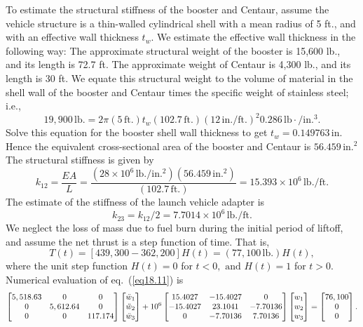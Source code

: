 \documentclass{AeroStructure-ERJohnson}
\begin{document}
To estimate the structural stiffness of the booster and Centaur, assume the vehicle structure is a thin-walled cylindrical shell with a mean radius of 5 ft., and with an effective wall thickness $t_{w}$. We estimate the effective wall thickness in the following way: The approximate structural weight of the booster is 15,600 lb., and its length is 72.7 ft. The approximate weight of Centaur is 4,300 lb., and its length is 30 ft. We equate this structural weight to the volume of material in the shell wall of the booster and Centaur times the specific weight of stainless steel; i.e.,
\[
19{,}900\,\mathrm{lb}.=2 \pi(5\,\mathrm{ft}.) t_{w}(102.7\,\mathrm{ft}.)(12\,\mathrm{in}./\mathrm{ft}.)^{2} 0.286\,\mathrm{lb} {\cdot}/ \mathrm{in}.^{3}.
\]
Solve this equation for the booster shell wall thickness to get $t_{w}=0.149763\,\text{in}$. Hence the equivalent cross-sectional area of the booster and Centaur is $56.459\,\text{in.}^{2}$ The structural stiffness is given by
\[
k_{12}=\frac{E A}{L}=\frac{\left(28 \times 10^{6}\,\mathrm{lb}./\mathrm{in}.^{2}\right)\left(56.459\,\mathrm{in.}^{2}\right)}{(102.7\,\mathrm{ft}.)}=15.393 \times 10^{6}\,\mathrm{lb}./\mathrm{ft}.
\]
The estimate of the stiffness of the launch vehicle adapter is
\[
k_{23}=k_{12}/2=7.7014 \times 10^{6}\,\mathrm{lb}./\mathrm{ft}.
\]
We neglect the loss of mass due to fuel burn during the initial period of liftoff, and assume the net thrust is a step function of time. That is,
\[
T(t)=[439,300-362,200] H(t)=(77{,}100\,\mathrm{lb}.) H(t),
\]
where the unit step function $H(t)=0$ for $t<0,\text{ and }H(t)=1$ for $t>0$. Numerical evaluation of eq.~(\ref{eq18.11}) is
\begin{align}\label{eq18.12}
\left[\begin{array}{@{}ccc@{}}5,518.63 & 0 & 0 \\0 & 5,612.64 & 0 \\0 & 0 & 117.174\end{array}\right]\left[\begin{array}{@{}c@{}}\ddot{w}_{1} \\\ddot{w}_{2} \\\ddot{w}_{3}\end{array}\right]+10^{6}\left[\begin{array}{@{}ccc@{}}15.4027 & -15.4027 & 0 \\-15.4027 & 23.1041 & -7.70136 \\0 & -7.70136 & 7.70136\end{array}\right]\left[\begin{array}{@{}l@{}}w_{1} \\w_{2} \\w_{3}\end{array}\right]=\left[\begin{array}{@{}c@{}}76,100 \\0 \\0\end{array}\right].
\end{align}
\end{document}
